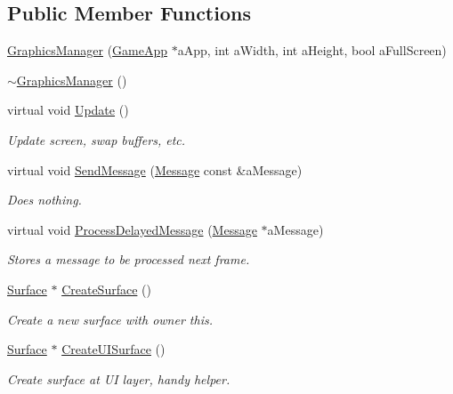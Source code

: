 \subsection*{Public Member Functions}
\begin{DoxyCompactItemize}
\item 
\hyperlink{classGraphicsManager_a82efa13e474eb235979ec46c49bebe75}{Graphics\+Manager} (\hyperlink{classGameApp}{Game\+App} $\ast$a\+App, int a\+Width, int a\+Height, bool a\+Full\+Screen)
\item 
\hyperlink{classGraphicsManager_ab5fdf685bbe4ae44b980ffc930ca1b6d}{$\sim$\+Graphics\+Manager} ()
\item 
virtual void \hyperlink{classGraphicsManager_a84004634b1d8d0435f6adfaaf6b3d4b4}{Update} ()
\begin{DoxyCompactList}\small\item\em Update screen, swap buffers, etc. \end{DoxyCompactList}\item 
virtual void \hyperlink{classGraphicsManager_a1dfc5ea39106bac02b4cdaaea5e4d20b}{Send\+Message} (\hyperlink{classMessage}{Message} const \&a\+Message)
\begin{DoxyCompactList}\small\item\em Does nothing. \end{DoxyCompactList}\item 
virtual void \hyperlink{classGraphicsManager_a7de02da0159ccdc15f865d8c9d6278fe}{Process\+Delayed\+Message} (\hyperlink{classMessage}{Message} $\ast$a\+Message)
\begin{DoxyCompactList}\small\item\em Stores a message to be processed next frame. \end{DoxyCompactList}\item 
\hyperlink{classSurface}{Surface} $\ast$ \hyperlink{classGraphicsManager_adf5d37aa192eadab1473cdaeb961262e}{Create\+Surface} ()
\begin{DoxyCompactList}\small\item\em Create a new surface with owner this. \end{DoxyCompactList}\item 
\hyperlink{classSurface}{Surface} $\ast$ \hyperlink{classGraphicsManager_a9d18507e39b1d25c721409c2bf352a0b}{Create\+U\+I\+Surface} ()
\begin{DoxyCompactList}\small\item\em Create surface at UI layer, handy helper. \end{DoxyCompactList}\item 

\end{DoxyCompactItemize}
